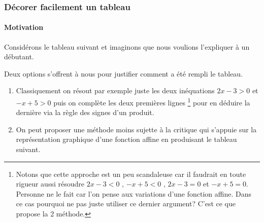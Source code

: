 \documentclass[12pt,a4paper]{article}
\begin{document}
%

\subsubsection{Décorer facilement un tableau}

\paragraph{Motivation}

Considérons le tableau suivant et imaginons que nous voulions l'expliquer à un débutant.

\begin{center}
\end{center}

Deux options s'offrent à nous pour justifier comment a été rempli le tableau.

\begin{enumerate}
    \item Classiquement on résout par exemple juste les deux inéquations $2 x - 3 > 0$ et $-x + 5 > 0$ puis on complète les deux premières lignes
    \footnote{
        Notons que cette approche est un peu scandaleuse car il faudrait en toute rigueur aussi résoudre
        $2 x - 3 < 0$ , $-x + 5 < 0$ , $2 x - 3 = 0$ et $-x + 5 = 0$.
        Personne ne le fait car l'on pense aux variations d'une fonction affine. Dans ce cas pourquoi ne pas juste utiliser ce dernier argument?
        C'est ce que propose la 2\ieme{} méthode.
    }
    pour en déduire la dernière via la règle des signes d'un produit.

    \item On peut proposer une méthode moins sujette à la critique qui s'appuie sur la représentation graphique d'une fonction affine en produisant le tableau suivant.
\end{enumerate}
\end{document}

